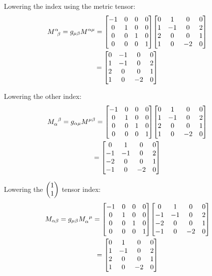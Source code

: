 \documentclass{report}
\begin{document}
\begin{subquests}
\begin{subquests}
\begin{subquests}
			\item
			Lowering the index using the metric tensor:
			\begin{gather*}
				M^{\alpha}_{\;\;\beta} = g_{\mu \beta} M^{\alpha \mu} =
				\mqty[
					-1 & 0 & 0 & 0 \\
					0 & 1 & 0 & 0 \\
					0 & 0 & 1 & 0 \\
					0 & 0 & 0 & 1
				]
				\mqty[
					0 & 1 & 0 & 0 \\
					1 & -1 & 0 & 2 \\
					2 & 0 & 0 & 1 \\
					1 & 0 & -2 & 0
				]\\
				=
				\mqty[
					0 & -1 & 0 & 0 \\
					1 & -1 & 0 & 2 \\
					2 & 0 & 0 & 1 \\
					1 & 0 & -2 & 0
				]
			\end{gather*}
			
			\item
			Lowering the other index:
			\begin{gather*}
				M_{\alpha}^{\;\;\beta} = g_{\alpha \mu} M^{\mu \beta} =
				\mqty[
					-1 & 0 & 0 & 0 \\
					0 & 1 & 0 & 0 \\
					0 & 0 & 1 & 0 \\
					0 & 0 & 0 & 1
				]
				\mqty[
					0 & 1 & 0 & 0 \\
					1 & -1 & 0 & 2 \\
					2 & 0 & 0 & 1 \\
					1 & 0 & -2 & 0
				]\\
				=
				\mqty[
					0 & 1 & 0 & 0 \\
					-1 & -1 & 0 & 2 \\
					-2 & 0 & 0 & 1 \\
					-1 & 0 & -2 & 0
				]
			\end{gather*}
			
			\item
			Lowering the $\pmqty{1 \\ 1}$ tensor index:
			\begin{gather*}
				M_{\alpha \beta} = g_{\mu \beta} M_{\alpha}^{\;\;\mu} =
				\mqty[
					-1 & 0 & 0 & 0 \\
					0 & 1 & 0 & 0 \\
					0 & 0 & 1 & 0 \\
					0 & 0 & 0 & 1
				]
				\mqty[
					0 & 1 & 0 & 0 \\
					-1 & -1 & 0 & 2 \\
					-2 & 0 & 0 & 1 \\
					-1 & 0 & -2 & 0
				] \\
				= 
				\mqty[
					0 & 1 & 0 & 0 \\
					1 & -1 & 0 & 2 \\
					2 & 0 & 0 & 1 \\
					1 & 0 & -2 & 0
				]
			\end{gather*}
		\end{subquests}


\end{subquests}
\end{subquests}
\end{document}
